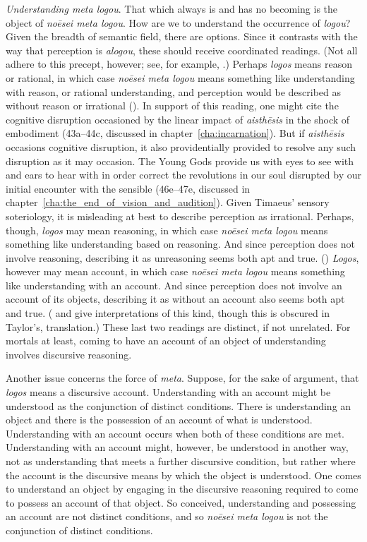 \emph{Understanding \emph{meta logou}}. That which always is and has no becoming is the object of \emph{noēsei meta logou}. How are we to understand the occurrence of \emph{logou}? Given the breadth of semantic field, there are options. Since it contrasts with the way that perception is \emph{alogou}, these should receive coordinated readings. (Not all adhere to this precept, however; see, for example, \citealt[13]{Zeyl:2000cs}.) Perhaps \emph{logos} means reason or rational, in which case \emph{noēsei meta logou} means something like understanding with reason, or rational understanding, and perception would be described as without reason or irrational (\citealt[87]{Archer-Hind:1888qd}). In support of this reading, one might cite the cognitive disruption occasioned by the linear impact of \emph{aisthēsis} in the shock of embodiment (43a--44c, discussed in chapter~\ref{cha:incarnation}). But if \emph{aisthēsis} occasions cognitive disruption, it also providentially provided to resolve any such disruption as it may occasion. The Young Gods provide us with eyes to see with and ears to hear with in order correct the revolutions in our soul disrupted by our initial encounter with the sensible (46e--47e, discussed in chapter~\ref{cha:the_end_of_vision_and_audition}). Given Timaeus' sensory soteriology, it is misleading at best to describe perception as irrational. Perhaps, though, \emph{logos} may mean reasoning, in which case \emph{noēsei meta logou} means something like understanding based on reasoning. And since perception does not involve reasoning, describing it as unreasoning seems both apt and true. (\citealt{Bury:1929jb}) \emph{Logos}, however may mean account, in which case \emph{noēsei meta logou} means something like understanding with an account. And since perception does not involve an account of its objects, describing it as without an account also seems both apt and true. (\citealt[61]{Taylor:1928qb} and  \citealt{Cornford:1935fk} give interpretations of this kind, though this is obscured in Taylor's, \citeyear[25]{Taylor:1929ov} translation.) These last two readings are distinct, if not unrelated. For mortals at least, coming to have an account of an object of understanding involves discursive reasoning.

Another issue concerns the force of \emph{meta}. Suppose, for the sake of argument, that \emph{logos} means a discursive account. Understanding with an account might be understood as the conjunction of distinct conditions. There is understanding an object and there is the possession of an account of what is understood. Understanding with an account occurs when both of these conditions are met. Understanding with an account might, however, be understood in another way, not as understanding that meets a further discursive condition, but rather where the account is the discursive means by which the object is understood. One comes to understand an object by engaging in the discursive reasoning required to come to possess an account of that object. So conceived, understanding and possessing an account are not distinct conditions, and so \emph{noēsei meta logou} is not the conjunction of distinct conditions. 


